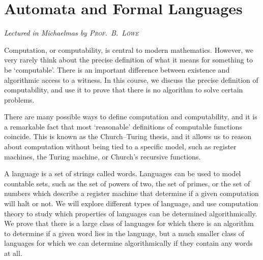 \chapter[Automata and Formal Languages \\ \textnormal{\emph{Lectured in Michaelmas \oldstylenums{2022} by \textsc{Prof.\ B.\ L\"owe}}}]{Automata and Formal Languages}
\emph{\Large Lectured in Michaelmas  by \textsc{Prof.\ B.\ L\"owe}}

Computation, or computability, is central to modern mathematics.
However, we very rarely think about the precise definition of what it means for something to be `computable'.
There is an important difference between existence and algorithmic access to a witness.
In this course, we discuss the precise definition of computability, and use it to prove that there is no algorithm to solve certain problems.

There are many possible ways to define computation and computability, and it is a remarkable fact that most `reasonable' definitions of computable functions coincide.
This is known as the Church--Turing thesis, and it allows us to reason about computation without being tied to a specific model, such as register machines, the Turing machine, or Church's recursive functions.

A language is a set of strings called words.
Languages can be used to model countable sets, such as the set of powers of two, the set of primes, or the set of numbers which describe a register machine that determine if a given computation will halt or not.
We will explore different types of language, and use computation theory to study which properties of languages can be determined algorithmically.
We prove that there is a large class of languages for which there is an algorithm to determine if a given word lies in the language, but a much smaller class of languages for which we can determine algorithmically if they contain any words at all.


